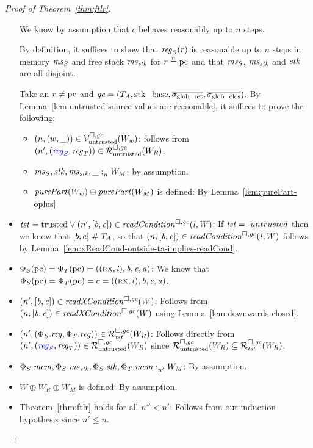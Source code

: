 \begin{proof}[Proof of Theorem~\ref{thm:ftlr}]
\begin{itemize}
  We know by assumption that $c$ behaves reasonably up to $n$ steps.

  By definition, it suffices to show that $\reg_S(r)$ is reasonable up to $n$ steps in memory $\ms_S$ and free stack $\ms_\stk$ for $r \nequal \pcreg$ and that $\ms_S$, $\ms_\stk$ and $\stk$ are all disjoint.

  Take an $r \neq \pcreg$ and $\gc = (\ta,\stkb,\gsigrets,\gsigcloss)$.
  By Lemma~\ref{lem:untrusted-source-values-are-reasonable}, it suffices to prove the following:
  \begin{itemize}
  \item $\npair{(w,\_)} \in \lrv(W_w)$: follows from $\npair[n']{\stpair{\reg}{\reg}} \in \lrr(W_R)$.
  \item $\memSat{\ms_S,\stk,\ms_\stk,\_}{W_M}$: by assumption.
  \item $\purePart{W_w} \oplus \purePart{W_M}$ is defined: By Lemma~\ref{lem:purePart-oplus}
  \end{itemize}

\item $\trust = \trusted \vee \npair[n']{[\baddr,\eaddr]} \in \readCond{\lin,W}$:
  If $\trust =\ untrusted$ then we know that $[b,e] \mathrel{\#} \ta$, so that $\npair{[\baddr,\eaddr]} \in \readCond{\lin,W}$ follows by Lemma~\ref{lem:xReadCond-outside-ta-implies-readCond}.

\item $\Phi_S(\pcreg) = \Phi_T(\pcreg) = ((\rx,\lin),\baddr,\eaddr,\aaddr)$:
  We know that $\Phi_S(\pcreg) = \Phi_T(\pcreg) = c = ((\rx,\lin),\baddr,\eaddr,\aaddr)$. 

\item $\npair[n']{[\baddr,\eaddr]} \in \xReadCond{W}$:
  Follows from $\npair{[\baddr,\eaddr]} \in \xReadCond{W}$ using Lemma~\ref{lem:downwards-closed}.

\item $\npair[n']{(\Phi_S.\reg,\Phi_T.\reg)} \in \lrrg{\trust}(W_R)$:
  Follows directly from $\npair[n']{\stpair{\reg}{\reg}} \in \lrr(W_R)$  since $\lrr(W_R) \subseteq \lrrg{\trust}(W_R)$.

\item $\memSat[n']{\Phi_S.\mem,\Phi_S.\ms_\stk,\Phi_S.\stk,\Phi_T.\mem}{W_M}$:
  By assumption.

\item $W \oplus W_R \oplus W_M$ is defined:
  By assumption.

\item Theorem~\ref{thm:ftlr} holds for all $n'' < n'$:
  Follows from our induction hypothesis since $n' \le n$.

\end{itemize}
\end{proof}


